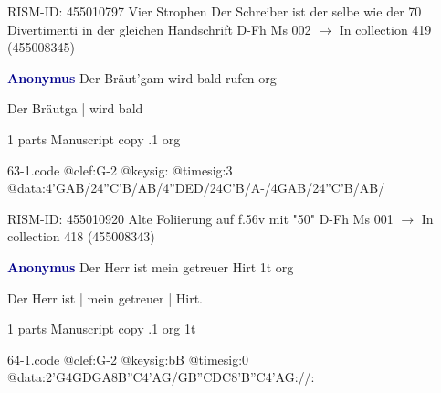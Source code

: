 \documentclass[twocolumn]{book}
\begin{document}
\newline RISM-ID: 455010797
\newline Vier Strophen
\newline Der Schreiber ist der selbe wie der 70 Divertimenti in der gleichen Handschrift
\newline D-Fh  Ms 002
\newline $\rightarrow$ In collection 419 (455008345)

\newline \par \vspace{7pt} \textcolor{darkblue}{\textbf{Anonymus  }}
\newline Der Bräut'gam wird bald rufen    
\newline org
\newline \begin{itshape}[f.56v, at left:] Der Bräutga | wird bald\end{itshape} 
\newline \textcolor{darkblue}{}  1 parts  
\newline Manuscript copy
.1  org  
\begin{filecontents*}{63-1.code}
@clef:G-2
@keysig:
@timesig:3
@data:4'GAB/24''C'B/AB/4''DED/24C'B/A-/4GAB/24''C'B/AB/
\end{filecontents*}
\newline
%

\newline RISM-ID: 455010920
\newline Alte Foliierung auf f.56v mit "50"
\newline D-Fh  Ms 001
\newline $\rightarrow$ In collection 418 (455008343)

\newline \par \vspace{7pt} \textcolor{darkblue}{\textbf{Anonymus  }}
\newline Der Herr ist mein getreuer Hirt  1t  
\newline org
\newline \begin{itshape}[f.30v, at left:] Der Herr ist | mein getreuer | Hirt.\end{itshape} 
\newline \textcolor{darkblue}{}  1 parts  
\newline Manuscript copy
.1  org  1t  
\begin{filecontents*}{64-1.code}
@clef:G-2
@keysig:bB
@timesig:0
@data:2'G4GDGA{8B''C}4'AG/GB''CDC{8'B''C}4'AG://:
\end{filecontents*}
\newline
%
\end{document}
